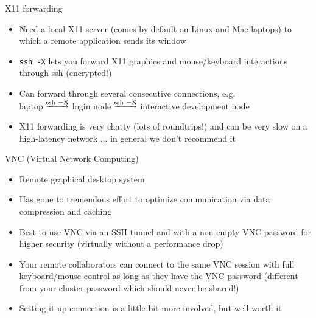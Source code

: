 \begin{frame}{X11 forwarding}
  \begin{itemize}\setlength{\itemsep}{3mm}
  \item Need a local X11 server (comes by default on Linux and Mac laptops) to which a remote application
    sends its window
  \item \texttt{ssh -X} lets you forward X11 graphics and mouse/keyboard interactions through ssh (encrypted!)
  \item Can forward through several consecutive connections, e.g.\\ laptop $^{\underrightarrow{\rm
      ssh~-X}}$ login node $^{\underrightarrow{\rm ssh~-X}}$ interactive development node
    \pause
  \item X11 forwarding is very chatty (lots of roundtrips!) and can be very slow on a high-latency
    network ... in general we don't recommend it
  \end{itemize}
\end{frame}

\begin{frame}{VNC (Virtual Network Computing)}
  \begin{itemize}\setlength{\itemsep}{3mm}
  \item Remote graphical desktop system
  \item Has gone to tremendous effort to optimize communication via data compression and caching
  \item Best to use VNC via an SSH tunnel and with a non-empty VNC password for higher security
    (virtually without a performance drop)
  \item Your remote collaborators can connect to the same VNC session with full keyboard/mouse control as long
    as they have the VNC password (different from your cluster password which should never be shared!)
  \item Setting it up connection is a little bit more involved, but well worth it
  \end{itemize}
\end{frame}

